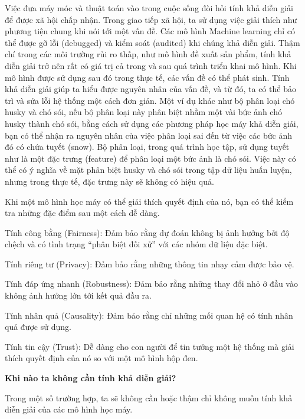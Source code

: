 Việc đưa máy móc và thuật toán vào trong cuộc sống đòi hỏi tính khả diễn giải để được xã hội chấp nhận. Trong giao tiếp xã hội, ta sử dụng việc giải thích như phương tiện chung khi nói tới một vấn đề. Các mô hình Machine learning chỉ có thể được gỡ lỗi (debugged) và kiểm soát (audited) khi chúng khả diễn giải. Thậm chí trong các môi trường rủi ro thấp, như mô hình đề xuất sản phẩm, tính khả diễn giải trở nên rất có giá trị cả trong và sau quá trình triển khai mô hình. Khi mô hình được sử dụng sau đó trong thực tế, các vấn đề có thể phát sinh. Tính khả diễn giải giúp ta hiểu được nguyên nhân của vấn đề, và từ đó, ta có thể bảo trì và sửa lỗi hệ thống một cách đơn giản. Một ví dụ khác như bộ phân loại chó husky và chó sói, nếu bộ phân loại này phân biệt nhầm một vài bức ảnh chó husky thành chó sói, bằng cách sử dụng các phương pháp học máy khả diễn giải, bạn có thể nhận ra nguyên nhân của việc phân loại sai đến từ việc các bức ảnh đó có chứa tuyết (snow). Bộ phân loại, trong quá trình học tập, sử dụng tuyết như là một đặc trưng (feature) để phân loại một bức ảnh là chó sói. Việc này có thể có ý nghĩa về mặt phân biệt husky và chó sói trong tập dữ liệu huấn luyện, nhưng trong thực tế, đặc trưng này sẽ không có hiệu quả.

Khi một mô hình học máy có thể giải thích quyết định của nó, bạn có thể kiểm tra những đặc điểm sau một cách dễ dàng.

\begin{packed_enum}
    \item Tính công bằng (Fairness): Đảm bảo rằng dự đoán không bị ảnh hưởng bởi độ chệch và có tình trạng ``phân biệt đối xử'' với các nhóm dữ liệu đặc biệt.
    \item Tính riêng tư (Privacy): Đảm bảo rằng những thông tin nhạy cảm được bảo vệ.
    \item Tính đáp ứng nhanh (Robustness): Đảm bảo rằng những thay đổi nhỏ ở đầu vào không ảnh hưởng lớn tới kết quả đầu ra.
    \item Tính nhân quả (Causality): Đảm bảo rằng chỉ những mối quan hệ có tính nhân quả được sử dụng.
    \item Tính tin cậy (Trust): Dễ dàng cho con người để tin tưởng một hệ thống mà giải thích quyết định của nó so với một mô hình hộp đen.
\end{packed_enum}
\textbf{Khi nào ta không cần tính khả diễn giải?}

Trong một số trường hợp, ta sẽ không cần hoặc thậm chỉ không muốn tính khả diễn giải của các mô hình học máy.

